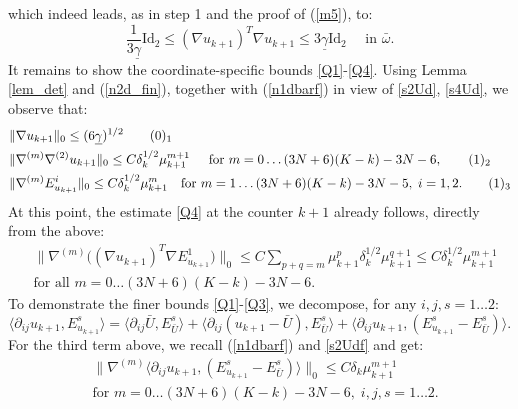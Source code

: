 \documentclass[reqno,twoside,11pt]{amsart}
\newcommand{\Id}{\mathrm{Id}}
\numberwithin{equation}{section}
\theoremstyle{plain}
\theoremstyle{definition}
\begin{document}
which indeed leads, as in step 1 and the proof of (\ref{m5}), to:
\begin{equation}\label{n2d_fin}
\frac{1}{3\underline\gamma}\Id_2\leq (\nabla u_{k+1})^T\nabla u_{k+1}\leq
3\underline\gamma\Id_2 \quad\mbox{ in } \bar\omega.
\end{equation}
It remains to show the coordinate-specific bounds \ref{Q1}-\ref{Q4}.
Using Lemma \ref{lem_det} and (\ref{n2d_fin}), together with (\ref{n1dbarf}) in
view of \ref{s2Ud}, \ref{s4Ud}, we observe that:
\begin{align*}
& \|\nabla u_{k+1}\|_0\leq (6\underline\gamma)^{1/2}
\tag*{(\theequation)$_1$}\refstepcounter{equation} \label{s1Udf} \\
& \|\nabla^{(m)}\nabla^{(2)} u_{k+1}\|_0\leq 
C\delta_{k}^{1/2}\mu_{k+1}^{m+1} \quad\,\;\mbox{for }m=0\ldots (3N+6)(K-k)-3N-6,
\tag*{(\theequation)$_2$} \label{s2Udf} \\
& \|\nabla^{(m)}E^i_{u_{k+1}}\|_0\leq
C\delta_k^{1/2}\mu_{k+1}^m\quad \mbox{for } m=1\ldots (3N+6)(K-k)-3N-5,\;i=1,2. 
\tag*{(\theequation)$_3$} \label{s4Udf} 
\end{align*}
At this point, the estimate \ref{Q4} at the counter $k+1$ already
follows, directly from the above:
\begin{equation*}
\begin{split}
& \|\nabla^{(m)}\big((\nabla u_{k+1})^T \nabla E^1_{u_{k+1}}\big)\|_0 \leq
C\sum_{p+q=m} \mu_{k+1}^p\delta_{k}^{1/2}\mu_{k+1}^{q+1}\leq C \delta_{k}^{1/2}\mu_{k+1}^{m+1}
\\ & \mbox{for all } m=0\ldots (3N+6)(K-k)-3N-6.
\end{split}
\end{equation*}
To demonstrate the finer bounds \ref{Q1}-\ref{Q3}, we decompose, for any $i,j,s=1\ldots 2$:
\begin{equation}\label{eqeq_fin}
\langle \partial_{ij} u_{k+1}, E^s_{u_{k+1}}\rangle =
\langle \partial_{ij} \bar U, E^s_{\bar U}\rangle
+ \langle\partial_{ij}(u_{k+1}-\bar U), E^s_{\bar U}\rangle +
\langle\partial_{ij}u_{k+1}, (E^s_{u_{k+1}}-E^s_{\bar U})\rangle. 
\end{equation}
For the third term above, we recall (\ref{n1dbarf}) and \ref{s2Udf} and get:
\begin{equation}\label{1_term_fin}
\begin{split}
& \|\nabla^{(m)}\langle\partial_{ij}u_{k+1}, (E^s_{u_{k+1}}-E^s_{\bar U})\rangle\|_0 \leq
C\delta_k\mu_{k+1}^{m+1} \\ & \mbox{for } m=0\ldots (3N+6)(K-k)-3N-6,\; i,j,s=1\ldots 2.
\end{split}
\end{equation}
\end{document}
